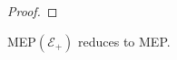 \begin{proof}

\end{proof}

\begin{proposition}
  MEP$(\mathcal{E}_{+})$ reduces to MEP.
\label{lem:plus}
\end{proposition}

